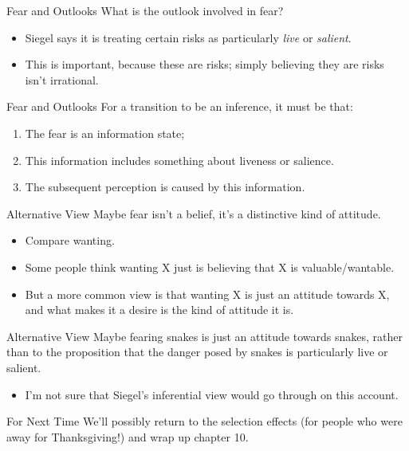 \documentclass[
  17pt,
  letterpaper,
  ignorenonframetext,
  aspectratio=169,
  handout,
  xcolor={dvipsnames}]{beamer}
\providecommand{\tightlist}{%
  \setlength{\itemsep}{0pt}\setlength{\parskip}{0pt}}\usepackage{longtable,booktabs,array}
\begin{document}
\begin{frame}{Fear and Outlooks}
\protect\hypertarget{fear-and-outlooks}{}
What is the outlook involved in fear?

\begin{itemize}[<+->]
\tightlist
\item
  Siegel says it is treating certain risks as particularly \emph{live}
  or \emph{salient}.
\item
  This is important, because these are risks; simply believing they are
  risks isn't irrational.
\end{itemize}
\end{frame}

\begin{frame}{Fear and Outlooks}
\protect\hypertarget{fear-and-outlooks-1}{}
For a transition to be an inference, it must be that:

\begin{enumerate}[<+->]
\tightlist
\item
  The fear is an information state;
\item
  This information includes something about liveness or salience.
\item
  The subsequent perception is caused by this information.
\end{enumerate}
\end{frame}

\begin{frame}{Alternative View}
\protect\hypertarget{alternative-view}{}
Maybe fear isn't a belief, it's a distinctive kind of attitude.

\begin{itemize}[<+->]
\tightlist
\item
  Compare wanting.
\item
  Some people think wanting X just is believing that X is
  valuable/wantable.
\item
  But a more common view is that wanting X is just an attitude towards
  X, and what makes it a desire is the kind of attitude it is.
\end{itemize}
\end{frame}

\begin{frame}{Alternative View}
\protect\hypertarget{alternative-view-1}{}
Maybe fearing snakes is just an attitude towards snakes, rather than to
the proposition that the danger posed by snakes is particularly live or
salient.

\begin{itemize}[<+->]
\tightlist
\item
  I'm not sure that Siegel's inferential view would go through on this
  account.
\end{itemize}
\end{frame}

\begin{frame}{For Next Time}
\protect\hypertarget{for-next-time}{}
We'll possibly return to the selection effects (for people who were away
for Thanksgiving!) and wrap up chapter 10.
\end{frame}
\end{document}
